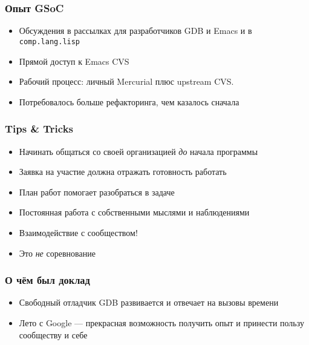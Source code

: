 \documentclass[onlymath]{beamer}
\begin{document}
\begin{frame}
  \frametitle{Опыт GSoC}
  \begin{itemize}
  \item Обсуждения в рассылках для разработчиков GDB и Emacs и в {\tt
      comp.lang.lisp}
  \item Прямой доступ к Emacs CVS
  \item Рабочий процесс: личный Mercurial плюс upstream CVS.
  \item Потребовалось больше рефакторинга, чем казалось сначала
  \end{itemize}
\end{frame}

\begin{frame}
  \frametitle{Tips \& Tricks}
  \begin{itemize}
  \item Начинать общаться со своей организацией \emph{до} начала программы
    
  \item Заявка на участие должна отражать готовность работать

  \item План работ помогает разобраться в задаче
    
  \item Постоянная работа с собственными мыслями и наблюдениями
    
  \item Взаимодействие с сообществом!

  \item Это \emph{не} соревнование
  \end{itemize}
\end{frame}

\appendix
\begin{frame}
  \frametitle{О чём был доклад}
  \begin{itemize}
  \item Свободный отладчик GDB развивается и отвечает на вызовы
    времени
  \item Лето с Google — прекрасная возможность получить опыт и
    принести пользу сообществу и себе
  \end{itemize}
\end{frame}
\end{document}
